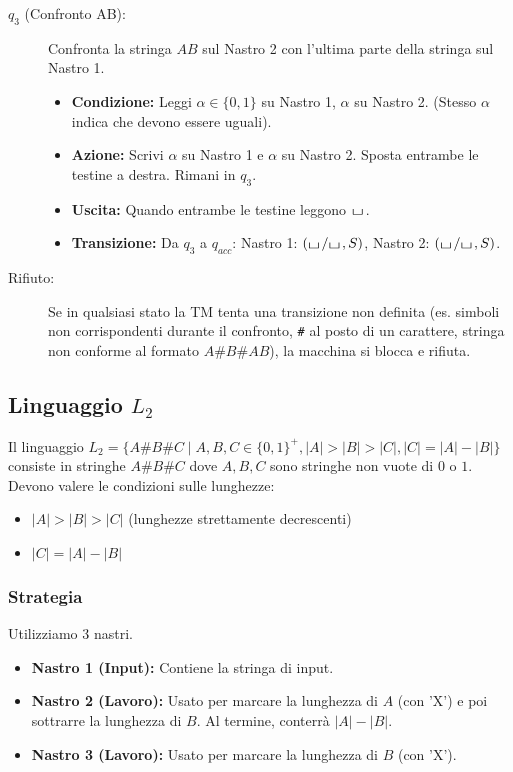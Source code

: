 \documentclass[a4paper]{article}
\theoremstyle{definition} %
\newcommand{\blankS}{\ensuremath{\raisebox{-0.15ex}{\scalebox{1.3}[0.7]{$\sqcup$}}\mkern2mu}}
\begin{document}
\begin{description}
\begin{itemize}
    \end{itemize}
    \item[$q_3$ (Confronto AB):] Confronta la stringa $AB$ sul Nastro 2 con l'ultima parte della stringa sul Nastro 1.
    \begin{itemize}
        \item \textbf{Condizione:} Leggi $\alpha \in \{0,1\}$ su Nastro 1, $\alpha$ su Nastro 2. (Stesso $\alpha$ indica che devono essere uguali).
        \item \textbf{Azione:} Scrivi $\alpha$ su Nastro 1 e $\alpha$ su Nastro 2. Sposta entrambe le testine a destra. Rimani in $q_3$.
        \item \textbf{Uscita:} Quando entrambe le testine leggono $\blankS$.
        \item \textbf{Transizione:} Da $q_3$ a $q_{acc}$: Nastro 1: $(\blankS/\blankS, S)$, Nastro 2: $(\blankS/\blankS, S)$.
    \end{itemize}
    \item[Rifiuto:] Se in qualsiasi stato la TM tenta una transizione non definita (es. simboli non corrispondenti durante il confronto, \texttt{\#} al posto di un carattere, stringa non conforme al formato $A\texttt{\#}B\texttt{\#}AB$), la macchina si blocca e rifiuta.
\end{description}

\subsection{Linguaggio $L_2$}
Il linguaggio $L_2 = \{A\#B\#C \mid A,B,C \in \{0,1\}^+, |A|>|B|>|C|, |C|=|A|-|B|\}$ consiste in stringhe $A\#B\#C$ dove $A,B,C$ sono stringhe non vuote di $0$ o $1$. Devono valere le condizioni sulle lunghezze:
\begin{itemize}
    \item $|A| > |B| > |C|$ (lunghezze strettamente decrescenti)
    \item $|C| = |A| - |B|$
\end{itemize}

\subsubsection{Strategia}
Utilizziamo 3 nastri.
\begin{itemize}
    \item \textbf{Nastro 1 (Input):} Contiene la stringa di input.
    \item \textbf{Nastro 2 (Lavoro):} Usato per marcare la lunghezza di $A$ (con 'X') e poi sottrarre la lunghezza di $B$. Al termine, conterrà $|A|-|B|$.
    \item \textbf{Nastro 3 (Lavoro):} Usato per marcare la lunghezza di $B$ (con 'X').
\end{itemize}
\end{document}
